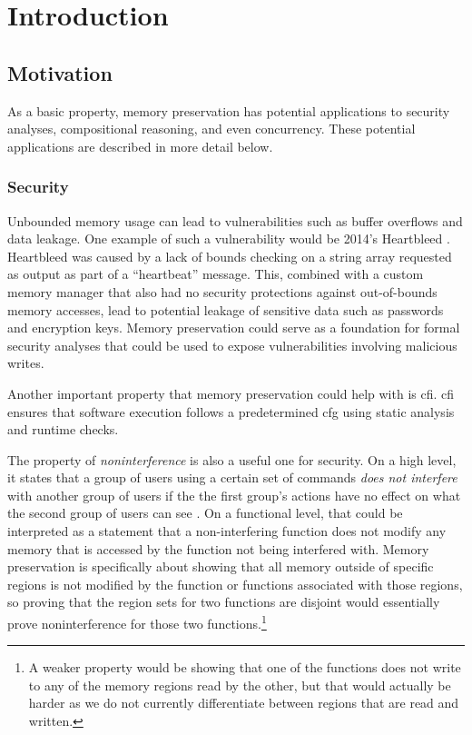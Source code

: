 \chapter{Introduction}


\section{Motivation}
As a basic property, memory preservation has potential applications to security analyses,
compositional reasoning, and even concurrency.
These potential applications are described in more detail below.

\subsection{Security}
Unbounded memory usage can lead to vulnerabilities
such as buffer overflows and data leakage.
One example of such a vulnerability would be 2014's Heartbleed \autocite{heartbleed}.
Heartbleed was caused by a lack of bounds checking on a string array
requested as output as part of a ``heartbeat'' message.
This, combined with a custom memory manager
that also had no security protections against out-of-bounds memory accesses,
lead to potential leakage of sensitive data such as passwords and encryption keys.
Memory preservation could serve as a foundation for formal security analyses
that could be used to expose vulnerabilities involving malicious writes.

Another important property that memory preservation could help with
is \ac{cfi}. \Ac{cfi} ensures that software execution
follows a predetermined \ac{cfg} using static analysis and runtime checks.

The property of \emph{noninterference} is also a useful one for security.
On a high level, it states that a group of users using a certain set of commands
\emph{does not interfere} with another group of users if the the first group's actions
have no effect on what the second group of users can see
\autocite{goguen1982security,rushby1992noninterference}.
On a functional level, that could be interpreted as a statement that a non-interfering function does not modify any memory that is accessed
by the function not being interfered with.
Memory preservation is specifically about showing that all memory outside of
specific regions is not modified by the function
or functions associated with those regions, so proving that the region sets
for two functions are disjoint
would essentially prove noninterference for those two functions.\footnote{%
  A weaker property would be showing that one of the functions does not write
  to any of the memory regions read by the other, but that would actually be harder
  as we do not currently differentiate between regions that are read and written.%
}

